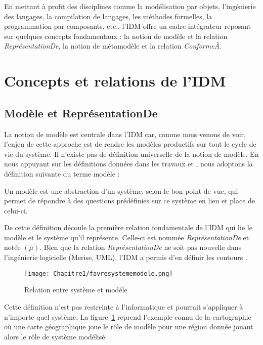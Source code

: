 En mettant à profit des disciplines comme la modélisation par objets, l'ingénierie des langages, la compilation de langages, les méthodes formelles, la programmation par composants, etc., l'IDM offre un cadre intégrateur reposant sur quelques concepts fondamentaux : la notion de modèle et la relation \textit{ReprésentationDe}, la notion de métamodèle et la relation \textit{ConformeÀ}.

\section{Concepts et relations de l'IDM}
\subsection{Modèle et ReprésentationDe}
La notion de modèle est centrale dans l'IDM car, comme nous venons de voir, l'enjeu de cette approche est de rendre les modèles productifs sur tout le cycle de vie du système. Il n'existe pas de définition universelle de la notion de modèle. En nous appuyant sur les définitions données dans les travaux \cite{minsky1967computation} \cite{bezivin2001towards} et \cite{seidewitz2003models}, nous adoptons la définition suivante du terme modèle :

\begin{theorem}
Un modèle est une abstraction d'un système, selon le bon point de vue, qui permet de répondre à des questions prédéfinies sur ce système en lieu et place de celui-ci.
\end{theorem}

De cette définition découle la première relation fondamentale de l'IDM qui lie le modèle et le système qu'il représente. Celle-ci est nommée \textit{ReprésentationDe} et notée $(\mu)$. Bien que la relation \textit{ReprésentationDe} ne soit pas nouvelle dans l'ingénierie logicielle (Merise, UML), l'IDM a permis d'en définir les contours \cite{atkinson2003model} \cite{seidewitz2003models} \cite{bezivin2004search}.

\begin{figure}[!htbp]
 \begin{center}
  \texttt{[image: Chapitre1/favresystememodele.png]}
 \end{center}
 \caption{Relation entre système et modèle \protect\cite{favre2006ingenierie}}
 \label{fig:systemModele}
\end{figure}

Cette définition n'est pas restreinte à l'informatique et pourrait s'appliquer à n'importe quel système. 
La figure~\ref{fig:systemModele} reprend l'exemple connu de la cartographie où une carte géographique joue le rôle de modèle pour une région donnée jouant alors le rôle de système modélisé. 

